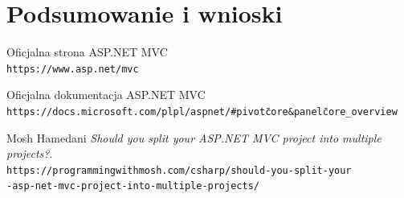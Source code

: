 \documentclass{article}
\begin{document}
\section{Podsumowanie i wnioski}


\newpage
\begin{thebibliography}{9}

Oficjalna strona ASP.NET MVC
\\\texttt{https://www.asp.net/mvc}

Oficjalna dokumentacja ASP.NET MVC
\\\texttt{https://docs.microsoft.com/pl\-pl/aspnet/\#pivot\=core\&panel\=core\_overview}

Mosh Hamedani
\textit{Should you split your ASP.NET MVC project into multiple projects?}.
\\\texttt{https://programmingwithmosh.com/csharp/should-you-split-your\\-asp-net-mvc-project-into-multiple-projects/}

\end{thebibliography}
\end{document}
